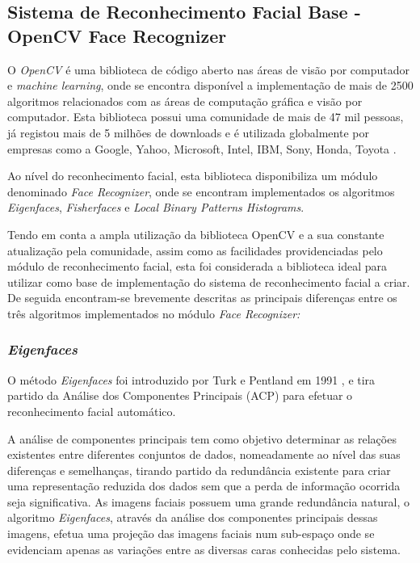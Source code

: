 \subsection{Sistema de Reconhecimento Facial Base - OpenCV Face Recognizer}
O \textit{OpenCV} é uma biblioteca de código aberto nas áreas de visão por computador e \textit{machine learning}, onde se encontra disponível a implementação de mais de 2500 algoritmos relacionados com as áreas de computação gráfica e visão por computador. Esta biblioteca possui uma comunidade de mais de 47 mil pessoas, já registou mais de 5 milhões de downloads e é utilizada globalmente por empresas como a Google, Yahoo, Microsoft, Intel, IBM, Sony, Honda, Toyota \cite{Team}. 

Ao nível do reconhecimento facial, esta biblioteca disponibiliza um módulo denominado \textit{Face Recognizer}, onde se encontram implementados os algoritmos \textit{Eigenfaces}, \textit{Fisherfaces} e \textit{Local Binary Patterns Histograms}.

Tendo em conta a ampla utilização da biblioteca OpenCV e a sua constante atualização pela comunidade, assim como as facilidades providenciadas pelo módulo de reconhecimento facial, esta foi considerada a biblioteca ideal para utilizar como base de implementação do sistema de reconhecimento facial a criar. De seguida encontram-se brevemente descritas as principais diferenças entre os três algoritmos implementados no módulo \textit{Face Recognizer:}

\subsubsection*{\textit{Eigenfaces}}
O método \textit{Eigenfaces} foi introduzido por Turk e Pentland em 1991 \cite{Turk1991}, e tira partido da Análise dos Componentes Principais (ACP) para efetuar o reconhecimento facial automático.

A análise de componentes principais tem como objetivo determinar as relações existentes entre diferentes conjuntos de dados, nomeadamente ao nível das suas diferenças e semelhanças, tirando partido da redundância existente para criar uma representação reduzida dos dados sem que a perda de informação ocorrida seja significativa. As imagens faciais possuem uma grande redundância natural, o algoritmo \textit{Eigenfaces}, através da análise dos componentes principais dessas imagens, efetua uma projeção das imagens faciais num sub-espaço onde se evidenciam apenas as variações entre as diversas caras conhecidas pelo sistema.

